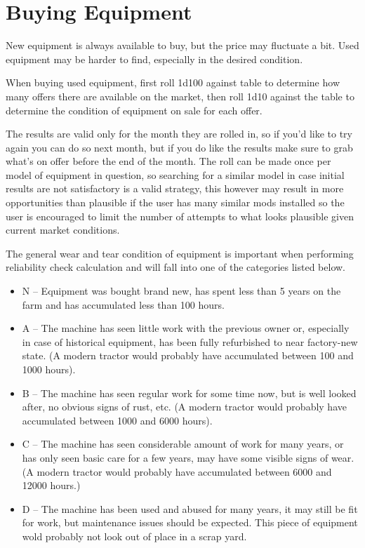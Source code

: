 \documentclass[a4paper,10pt]{article}
\begin{document}
\section{Buying Equipment}
New equipment is always available to buy, but the price may fluctuate a bit.
Used equipment may be harder to find, especially in the desired condition.

When buying used equipment, first roll 1d100 against table
 to determine how many offers there are
available on the market, then roll 1d10 against the table
 to determine the condition of
equipment on sale for each offer.

The results are valid only for the month they are rolled in, so if you'd like to
try again you can do so next month, but if you do like the results make sure to
grab what's on offer before the end of the month. The roll can be made once per
model of equipment in question, so searching for a similar model in case initial
results are not satisfactory is a valid strategy, this however may result in
more opportunities than plausible if the user has many similar mods installed so
the user is encouraged to limit the number of attempts to what looks plausible
given current market conditions.

The general wear and tear condition of equipment is important when performing
reliability check calculation and will fall into one of the categories listed
below.
\begin{itemize}
\item N -- Equipment was bought brand new, has spent less than 5 years on the
  farm and has accumulated less than 100 hours.
\item A -- The machine has seen little work with the previous owner or,
  especially in case of historical equipment, has been fully refurbished to near
  factory-new state. (A modern tractor would probably have accumulated between
  100 and 1000 hours).
\item B -- The machine has seen regular work for some time now, but is well
  looked after, no obvious signs of rust, etc. (A modern tractor would probably
  have accumulated between 1000 and 6000 hours).
\item C -- The machine has seen considerable amount of work for many years, or
  has only seen basic care for a few years, may have some visible signs of wear.
  (A modern tractor would probably have accumulated between 6000 and 12000
  hours.)
\item D -- The machine has been used and abused for many years, it may still be
  fit for work, but maintenance issues should be expected. This piece of
  equipment wold probably not look out of place in a scrap yard.
\end{itemize}
\end{document}
